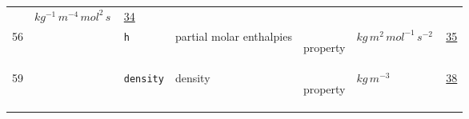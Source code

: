 \begin{longtable}{|p{1cm}|p{2.5cm}|p{4.5cm}|p{8cm}|p{3.0cm}|p{3cm}|p{1cm}|}
             & $ kg^{-1} \,m^{-4} \,mol^{2} \,s \, $
             &                 \hyperlink{"e:34"}{ 34 }
                 \\
        56
             & \hypertarget{"v:56"}{ $ {} $}
             & \verb|h|
             & partial molar enthalpies
             & \begin{lay}property \end{lay}
             & $ kg \,m^{2} \,mol^{-1} \,s^{-2} \, $
             &                 \hyperlink{"e:35"}{ 35 }
                 \\
        59
             & \hypertarget{"v:59"}{ $ {} $}
             & \verb|density|
             & density
             & \begin{lay}property \end{lay}
             & $ kg \,m^{-3} \, $
             &                 \hyperlink{"e:38"}{ 38 }
                 \\
    \end{longtable}